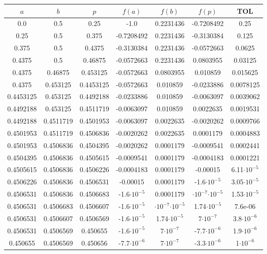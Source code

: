 \documentclass[12pt]{article}
\begin{document}
\begin{enumerate}
\begin{enumerate}
\begin{itemize}
            \begin{center}
            \begin{tabular}{|c|c|c|c|c|c|c|}
            \hline
            \(a\) & \(b\)& \(p\)&\(f(a)\) & \(f(b)\) & \(f(p)\)&\textbf{TOL} \\
            \hline
            0.0 & 0.5 & 0.25 & -1.0 & 0.2231436 & -0.7208492 & 0.25 \\
            0.25 & 0.5 & 0.375 & -0.7208492 & 0.2231436 & -0.3130384 & 0.125 \\
            0.375 & 0.5 & 0.4375 & -0.3130384 & 0.2231436 & -0.0572663 & 0.0625 \\
            0.4375 & 0.5 & 0.46875 & -0.0572663 & 0.2231436 & 0.0803955 & 0.03125 \\
            0.4375 & 0.46875 & 0.453125 & -0.0572663 & 0.0803955 & 0.010859 & 0.015625 \\
            0.4375 & 0.453125 & 0.4453125 & -0.0572663 & 0.010859 & -0.0233886 & 0.0078125 \\
            0.4453125 & 0.453125 & 0.4492188 & -0.0233886 & 0.010859 & -0.0063097 & 0.0039062 \\
            0.4492188 & 0.453125 & 0.4511719 & -0.0063097 & 0.010859 & 0.0022635 & 0.0019531 \\
            0.4492188 & 0.4511719 & 0.4501953 & -0.0063097 & 0.0022635 & -0.0020262 & 0.0009766 \\
            0.4501953 & 0.4511719 & 0.4506836 & -0.0020262 & 0.0022635 & 0.0001179 & 0.0004883 \\
            0.4501953 & 0.4506836 & 0.4504395 & -0.0020262 & 0.0001179 & -0.0009541 & 0.0002441 \\
            0.4504395 & 0.4506836 & 0.4505615 & -0.0009541 & 0.0001179 & -0.0004183 & 0.0001221 \\
            0.4505615 & 0.4506836 & 0.4506226 & -0.0004183 & 0.0001179 & -0.00015 & 6.11\(\cdot 10^{-5}\) \\
            0.4506226 & 0.4506836 & 0.4506531 & -0.00015 & 0.0001179 & -1.6\(\cdot 10^{-5}\) & 3.05\(\cdot 10^{-5}\) \\
            0.4506531 & 0.4506836 & 0.4506683 & -1.6\(\cdot 10^{-5}\) & 0.0001179 & \(\cdot 10^{-7}\)\(\cdot 10^{-5}\) & 1.53\(\cdot 10^{-5}\) \\
            0.4506531 & 0.4506683 & 0.4506607 & -1.6\(\cdot 10^{-5}\) & \(\cdot 10^{-7}\)\(\cdot 10^{-5}\) & 1.74\(\cdot 10^{-5}\) & 7.6e-06 \\
            0.4506531 & 0.4506607 & 0.4506569 & -1.6\(\cdot 10^{-5}\) & 1.74\(\cdot 10^{-5}\) & 7\(\cdot 10^{-7}\) & 3.8\(\cdot 10^{-6}\) \\
            0.4506531 & 0.4506569 & 0.450655 & -1.6\(\cdot 10^{-5}\) & 7\(\cdot 10^{-7}\) & -7.7\(\cdot 10^{-6}\) & 1.9\(\cdot 10^{-6}\) \\
            0.450655 & 0.4506569 & 0.450656 & -7.7\(\cdot 10^{-6}\) & 7\(\cdot 10^{-7}\) & -3.3\(\cdot 10^{-6}\) & 1\(\cdot 10^{-6}\) \\
            \hline 
            \end{tabular}
            \end{center}


\end{itemize}
\end{enumerate}
\end{enumerate}
\end{document}
